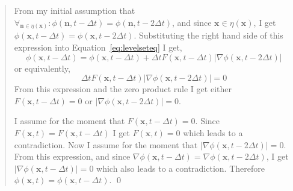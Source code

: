 \begin{quote}
\medskip

\medskip

\medskip

From my initial assumption that ${\forall }_{{\mathbf n}\in \eta \left({\mathbf x}\right)}:\phi\left({\mathbf n},t-\Delta t\right)=\phi({\mathbf n},t-2\Delta t)$, and since ${\mathbf x}\in \eta \left({\mathbf x}\right)$, I get $\phi\left({\mathbf x},t-\Delta t\right)=\phi({\mathbf x},t-2\Delta t)$. Substituting the right hand side of this expression into Equation~\ref{eq:levelseteq} I get,
\begin{equation}
\phi\left({\mathbf x},t-\Delta t\right)=\phi\left({\mathbf x},t-\Delta t\right)+\Delta tF\left({\mathbf x},t-\Delta t\right)\left|\nabla \phi\left({\mathbf x},t-2\Delta t\right)\right|
\end{equation}
or equivalently,
\begin{equation}
\Delta tF\left({\mathbf x},t-\Delta t\right)\left|\nabla \phi\left({\mathbf x},t-2\Delta t\right)\right|=0
\end{equation}
From this expression and the zero product rule I get either $F\left({\mathbf x},t-\Delta t\right)=0$ or $\left|\nabla \phi\left({\mathbf x},t-2\Delta t\right)\right|=0$.

\medskip

\medskip

\medskip

\medskip

I assume for the moment that $F\left({\mathbf x},t-\Delta t\right)=0$. Since $F\left({\mathbf x},t\right)=F\left({\mathbf x},t-\Delta t\right)$ I get $F\left({\mathbf x},t\right)=0$ which leads to a contradiction. Now I assume for the moment that $\left|\nabla \phi\left({\mathbf x},t-2\Delta t\right)\right|=0$. From this expression, and since $\nabla \phi\left({\mathbf x},t - \Delta t\right) = \nabla \phi\left({\mathbf x},t - 2 \Delta t\right)$, I get $\left|\nabla \phi\left({\mathbf x},t-\Delta t\right)\right|=0$ which also leads to a contradiction. Therefore $\phi\left({\mathbf x},t\right)=\phi\left({\mathbf x},t-\Delta t\right)$. \qed

\end{quote}

